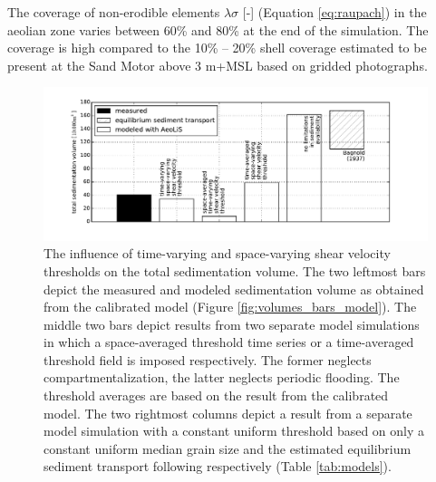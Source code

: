 \documentclass[preprint,12pt,authoryear]{elsarticle}
\begin{document}
The coverage of non-erodible elements $\lambda \sigma$ [-] (Equation
\ref{eq:raupach}) in the aeolian zone varies between 60\% and 80\% at
the end of the simulation. The coverage is high compared to the 10\%
-- 20\% shell coverage estimated to be present at the Sand Motor above
3 m+MSL based on gridded photographs.

\begin{figure}
  \centering
  \includegraphics[width=\columnwidth]{space_vs_time}
  \caption{The influence of time-varying and space-varying shear
    velocity thresholds on the total sedimentation volume. The two
    leftmost bars depict the measured and modeled sedimentation volume
    as obtained from the calibrated model (Figure
    \ref{fig:volumes_bars_model}). The middle two bars depict results
    from two separate model simulations in which a space-averaged
    threshold time series or a time-averaged threshold field is
    imposed respectively. The former neglects compartmentalization,
    the latter neglects periodic flooding. The threshold averages are
    based on the result from the calibrated model. The two rightmost
    columns depict a result from a separate model simulation with a
    constant uniform threshold based on only a constant uniform median
    grain size and the estimated equilibrium sediment transport
    following \citet{Bagnold1937a} respectively (Table
    \ref{tab:models}).}
  \label{fig:space_vs_time}
\end{figure}
\end{document}
